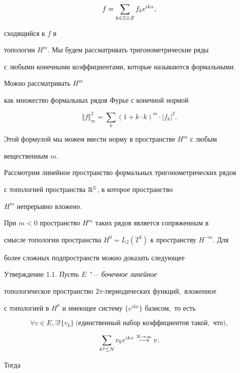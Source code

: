 $$

f =

\sum_{k \in {\Bbb Z\oplus Z}} f_k e^{i k x},

$$ 

сходящийся к $f$ в

топологии $H^m$. Мы будем рассматривать тригонометрические ряды

с любыми конечными коэффициентами, которые называются формальными.

Можно рассматривать $H^m$

как множество формальных рядов Фурье с конечной нормой

$$

\Vert f \Vert^2_m = \sum_k (1 + k \cdot k)^m \cdot |f_k|^2.

$$

Этой формулой мы можем ввести норму в пространстве $H^m$ с любым

вещественным $m$.







Рассмотрим линейное пространство формальных тригонометрических рядов

с топологией пространства ${\Bbb R}^{\Bbb Z}$, в которое пространство

$H^m$ непрерывно вложено.

При $m < 0$ пространство $H^m$ таких рядов является сопряженным в

смысле топологии пространства $H^0 = L_2 (T^2)$ к пространству $H^{-m}$. Для

более сложных подпространств можно доказать следующее



\smallskip

{\small \sc Утверждение  1.1.} \it Пусть $E$ "--- бочечное  линейное

топологическое  прост\-ранство  $2 \pi$-периодических  функций$,$  вложенное

с топологией  в $H^0$  и имеющее систему $\big \{ e^{i k x} \big \}$ базисом$,$ то есть

$$\forall v \in E,

\exists !\{ v_k \} ~\text{$($единственный набор коэффициентов такой$,$ что$),$}$$

$$\sum_{k^2 \le N} v_k

e^{i k x} \overset {\scriptsize N \to \infty}{\longrightarrow} v.

$$

Тогда

